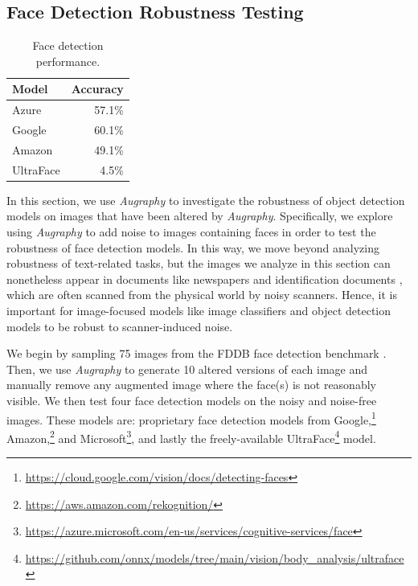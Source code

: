 \documentclass[runningheads]{llncs}
\begin{document}
\subsection{Face Detection Robustness Testing}
\begin{table}
    \centering
    \caption{Face detection performance.}
    \begin{tabular}{lr}
    \toprule
        \textbf{Model} & \textbf{Accuracy} \\
        \midrule
        Azure & 57.1\%\\
        Google & 60.1\%  \\
        Amazon & 49.1\% \\
        UltraFace & 4.5\%\\
        \bottomrule
    \end{tabular}
    \label{tab:face-detection-results}
\end{table}
In this section, we use \emph{Augraphy} to investigate the robustness of object detection models on images that have been altered by \emph{Augraphy}.
Specifically, we explore using \emph{Augraphy} to add noise to images containing faces in order to test the robustness of face detection models.
In this way, we move beyond analyzing robustness of text-related tasks, but the images we analyze in this section can nonetheless appear in documents like newspapers \cite{newspaper-navigator} and identification documents \cite{midv-500}, which are often scanned from the physical world by noisy scanners.
Hence, it is important for image-focused models like image classifiers and object detection models to be robust to scanner-induced noise.

We begin by sampling 75 images from the FDDB face detection benchmark \cite{fddbTech}.
Then, we use \emph{Augraphy} to generate 10 altered versions of each image and manually remove any augmented image where the face(s) is not reasonably visible.
We then test four face detection models on the noisy and noise-free images.
These models are: proprietary face detection models from Google,\footnote{\url{https://cloud.google.com/vision/docs/detecting-faces}} Amazon,\footnote{\url{https://aws.amazon.com/rekognition/}} and Microsoft\footnote{\url{https://azure.microsoft.com/en-us/services/cognitive-services/face}}, and lastly the freely-available UltraFace\footnote{\url{https://github.com/onnx/models/tree/main/vision/body_analysis/ultraface}} model.
\end{document}
